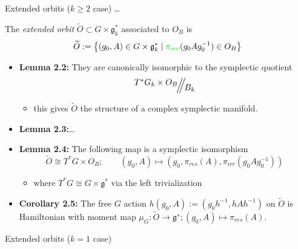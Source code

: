 \begin{frame}[fragile]{Extended orbits ($k\geq2$ case)}
  \dots
  \begin{defn}
    The \emph{extended orbit} $\tilde O\subset G\times \mathfrak{g}_k^*$
    associated to $O_B$ is
    \[
      \tilde O:=\left\{(g_0,A)\in G\times\mathfrak{g}_k^*
      \mid\textcolor{green!80!black}{\pi_{irr}}(g_0Ag_0^{-1})\in O_B\right\}
    \]
  \end{defn}
  \begin{itemize}
    \item \textbf{Lemma 2.2:} They are canonically isomorphic to the symplectic
      quotient
      \[
        \symplquot{T^*G_k\times O_B}{B_k}
      \]
    \begin{itemize}
      \item this gives $\tilde O$ the structure of a complex symplectic
        manifold.
    \end{itemize}
    \item \textbf{Lemma 2.3:}\dots
    \item \textbf{Lemma 2.4:} The following map is a symplectic isomorphism
      \[
        \tilde O\cong T^*G\times O_B;
        \qquad (g_0,A)\mapsto(g_0,\pi_{res}(A),\pi_{irr}(g_0Ag_0^{-1}))
      \]
      \begin{itemize}
        \item where $T^*G\cong G\times\mathfrak{g}^*$ via the left
          trivialization
      \end{itemize}
    \item \textbf{Corollary 2.5:} The free $G$ action
      $h(g_0,A):=(g_0h^{−1},hAh^{−1})$ on $\tilde O$ is Hamiltonian with moment
      map $\mu_G:\tilde O \to\mathfrak{g}^∗; (g_0,A) \mapsto \pi_{res}(A)$.
  \end{itemize}
\end{frame}

\begin{frame}{Extended orbits ($k=1$ case)}
  \cite[13]{boalch}
\end{frame}

